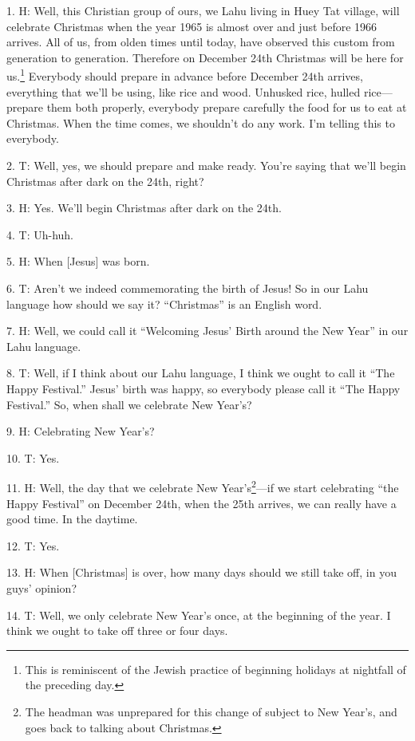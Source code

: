 \setcounter{footnote}{0}

1. H: Well, this Christian group of ours, we Lahu living in Huey Tat village, will
celebrate Christmas when the year 1965 is almost over and just before 1966 arrives.
All of us, from olden times until today, have observed this custom from generation
to generation. Therefore on December 24th Christmas will be here for us.\footnote{This is reminiscent of the Jewish practice of beginning holidays at nightfall of the preceding day.} Everybody
should prepare in advance before December 24th arrives, everything that we'll be
using, like rice and wood. Unhusked rice, hulled rice---prepare them both properly,
everybody prepare carefully the food for us to eat at Christmas. When the time
comes, we shouldn't do any work. I'm telling this to everybody.

2. T: Well, yes, we should prepare and make ready. You're saying that we'll begin
Christmas after dark on the 24th, right?

3. H: Yes. We'll begin Christmas after dark on the 24th.

4. T: Uh-huh.

5. H: When [Jesus] was born.

6. T: Aren't we indeed commemorating the birth of Jesus! So in our Lahu language
how should we say it? ``Christmas'' is an English word.

7. H: Well, we could call it ``Welcoming Jesus' Birth around the New Year'' in
our Lahu language.

8. T: Well, if I think about our Lahu language, I think we ought to call it ``The
Happy Festival.'' Jesus' birth was happy, so everybody please call it ``The Happy
Festival.'' So, when shall we celebrate New Year's?

9. H: Celebrating New Year's?

10. T: Yes.

11. H: Well, the day that we celebrate New Year's\footnote{The headman was unprepared for this change of subject to New Year's, and goes back to talking about Christmas.}---if we start celebrating
``the Happy Festival'' on December 24th, when the 25th arrives, we can really have
a good time. In the daytime.

12. T: Yes.

13. H: When [Christmas] is over, how many days should we still take off, in you
guys' opinion?

14. T: Well, we only celebrate New Year's once, at the beginning of the year.
I think we ought to take off three or four days.

